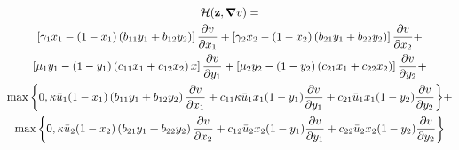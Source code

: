 \begin{multline}
  \label{eq:HamiltonianShort}
  \mathcal{H}(\mathbf{z}, \grad{v}) = \\
  \left[\gamma_1 x_1 - (1-x_1) \left(b_{11} y_1 + b_{12} y_2\right) \right] \pdv{v}{x_1} +
  \left[\gamma_2 x_2 - (1-x_2) \left(b_{21} y_1 + b_{22} y_2\right) \right] \pdv{v}{x_2} + \\
  \left[\mu_1 y_1 - (1-y_1) \left(c_{11} x_1 + c_{12} x_2\right) x\right] \pdv{v}{y_1} +
  \left[\mu_2 y_2 - (1-y_2) \left(c_{21} x_1 + c_{22} x_2\right)\right] \pdv{v}{y_2} + \\
  \max\bigg\{0, \kappa \bar{u}_1 (1-x_1) \left(b_{11} y_1 + b_{12} y_2\right) \pdv{v}{x_1} + c_{11} \kappa \bar{u}_1 x_1 (1-y_1)\pdv{v}{y_1} + c_{21} \bar{u}_1 x_1 (1-y_2) \pdv{v}{y_2}
  \bigg\} + \\
  \max\bigg\{0, \kappa \bar{u}_2 (1-x_2) \left(b_{21} y_1 + b_{22} y_2\right) \pdv{v}{x_2} + c_{12} \bar{u}_2 x_2 (1-y_1)\pdv{v}{y_1} + c_{22}  \bar{u}_2 x_2 (1-y_2)\pdv{v}{y_2} \bigg\}
\end{multline}
